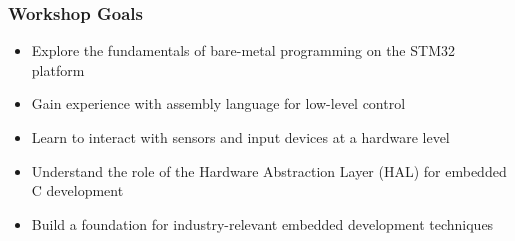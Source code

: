 \documentclass{beamer}
\begin{document}
\begin{frame}
    \frametitle{Workshop Goals}
    \begin{itemize}
        \item Explore the fundamentals of bare-metal programming on the STM32 platform
        \item Gain experience with assembly language for low-level control
        \item Learn to interact with sensors and input devices at a hardware level
        \item Understand the role of the Hardware Abstraction Layer (HAL) for embedded C development
        \item Build a foundation for industry-relevant embedded development techniques
    \end{itemize}
\end{frame}
\end{document}
